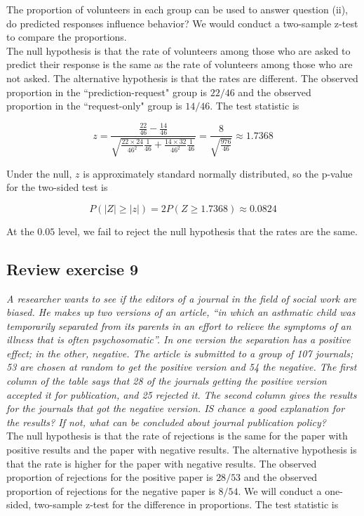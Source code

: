 \documentclass[11pt]{article}
\newcommand{\pr}{P} %
\begin{document}
The proportion of volunteers in each group can be used to answer question (ii), do predicted responses influence behavior?  We would conduct a two-sample z-test to compare the proportions. \\

The null hypothesis is that the rate of volunteers among those who are asked to predict their response is the same as the rate of volunteers among those who are not asked.  The alternative hypothesis is that the rates are different.  The observed proportion in the ``prediction-request" group is $22/46$ and the observed proportion in the ``request-only" group is $14/46$.  The test statistic is

$$z = \frac{ \frac{22}{46}-\frac{14}{46}}{ \sqrt{\frac{22\times 24}{46^2}\frac{1}{46} + \frac{14\times32}{46^2}\frac{1}{46}}} = \frac{ 8}{ \sqrt{\frac{976}{46}}} \approx  1.7368$$

Under the null, $z$ is approximately standard normally distributed, so the p-value for the two-sided test is

$$\pr( \lvert Z \rvert \geq \lvert z \rvert) = 2 \pr(Z \geq 1.7368) \approx 0.0824$$

At the $0.05$ level, we fail to reject the null hypothesis that the rates are the same.


\subsection*{Review exercise 9} %
\textit{A researcher wants to see if the editors of a journal in the field of social work are biased. He makes up two versions of an article, ``in which an asthmatic child was temporarily separated from its parents in an effort to relieve the symptoms of an illness that is often psychosomatic''. In one version the separation has a positive effect; in the other, negative. The article is submitted to a group of 107 journals; 53 are chosen at random to get the positive version and 54 the negative. The first column of the table says that 28 of the journals getting the positive version accepted it for publication, and 25 rejected it. The second column gives the results for the journals that got the negative version. IS chance a good explanation for the results? If not, what can be concluded about journal publication policy?}\\

The null hypothesis is that the rate of rejections is the same for the paper with positive results and the paper with negative results.  The alternative hypothesis is that the rate is higher for the paper with negative results.  The observed proportion of rejections for the positive paper is $28/53$ and the observed proportion of rejections for the negative paper is $8/54$. We will conduct a one-sided, two-sample z-test for the difference in proportions.  The test statistic is
\end{document}
